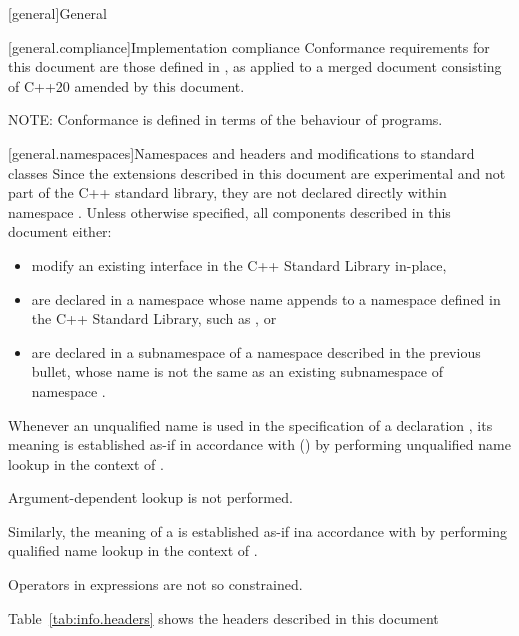 [general]{General}

[general.compliance]{Implementation compliance}
Conformance requirements for this document are those defined in , as applied to a merged document consisting of C++20 amended by this document.

NOTE: Conformance is defined in terms of the behaviour of programs.%

[general.namespaces]{Namespaces and headers and modifications to standard classes}
Since the extensions described in this document are experimental and not part of the C++ standard library, they are not declared directly within namespace . Unless otherwise specified, all components described in this document either:

\begin{itemize}
    \item modify an existing interface in the C++ Standard Library in-place,
    \item are declared in a namespace whose name appends  to a namespace defined in the C++ Standard Library, such as , or
    \item are declared in a subnamespace of a namespace described in the previous bullet, whose name is not the same as an existing subnamespace of namespace .
\end{itemize}

Whenever an unqualified name is used
in the specification of a declaration ,
its meaning is established
as-if in accordance with () by performing unqualified name lookup
in the context of .
\begin{note}
Argument-dependent lookup is not performed.\end{note}
Similarly, the meaning of a  is established
as-if ina accordance with  by performing qualified name lookup
in the context of .
\begin{note}
Operators in expressions are not so constrained.\end{note}

Table~\ref{tab:info.headers} shows the headers described in this document

